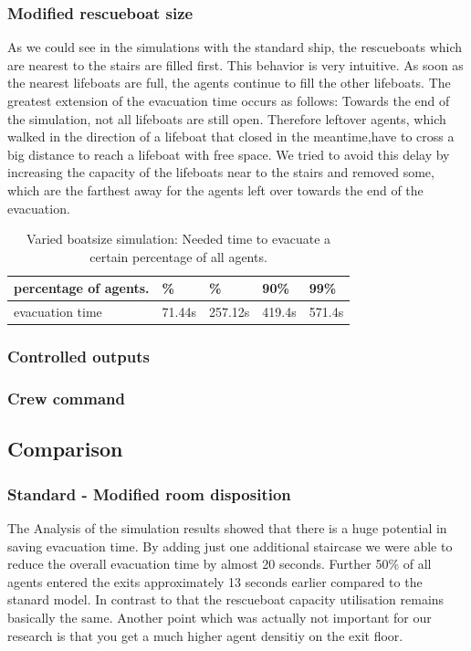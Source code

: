 \documentclass[11pt]{article}
\begin{document}
\subsubsection{Modified rescueboat size}
As we could see in the simulations with the standard ship, the rescueboats which are nearest to the stairs are filled first. This behavior is very intuitive. As soon as the nearest lifeboats are full, the agents continue to fill the other lifeboats. 
The greatest extension of the evacuation time occurs as follows:
Towards the end of the simulation, not all lifeboats are still open. Therefore leftover agents, which walked in the direction of a lifeboat that closed in the meantime,have to cross a big distance to reach a lifeboat with free space.\newline
We tried to avoid this delay by increasing the capacity of the lifeboats near to the stairs and removed some, which are the farthest away for the agents left over towards the end of the evacuation.



\begin{table}[h]
\centering
\begin{tabular}
{|>{\large}m{2cm} |>{\center}b{1.1cm} |>{\center}b{1.1cm}|>{}b{1.1cm}|>{}b{1.1cm}|} \hline \hline
percentage of agents.& 10\% &  50\% & 90\% & 99\% \\ \hline
evacuation time & 71.44s &257.12s & 419.4s & 571.4s \\ \hline \hline
\end{tabular}
\caption{Varied boatsize simulation: Needed time to evacuate a certain percentage of all agents.}
\end{table}





\subsubsection{Controlled outputs}
\subsubsection{Crew command}
\subsection{Comparison}
\subsubsection{Standard - Modified room disposition}
The Analysis of the simulation results showed that there is a huge potential in saving evacuation time. By adding just one additional staircase we were able to reduce the overall evacuation time by almost 20 seconds. Further 50\% of all agents entered the exits approximately 13 seconds earlier compared to the stanard model. In contrast to that the rescueboat capacity utilisation remains basically the same. Another point which was actually not important for our research is that you get a much higher agent densitiy on the exit floor. 
\end{document}
